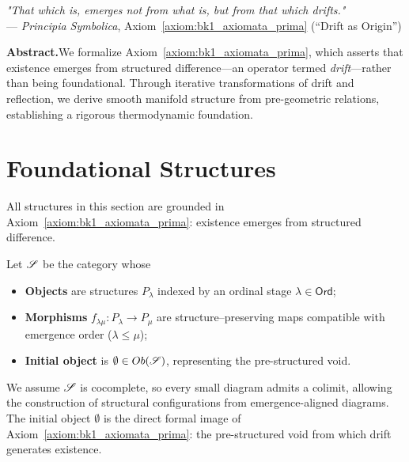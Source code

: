 ﻿
{}
\begin{center}
\textit{"That which is, emerges not from what is, but from that which drifts."} \\
— \textit{Principia Symbolica}, Axiom~\ref{axiom:bk1_axiomata_prima} (“Drift as Origin”)
\end{center}
\noindent\textbf{Abstract.}\hspace*{1em}We formalize
Axiom~\ref{axiom:bk1_axiomata_prima}, which asserts that existence emerges from
structured difference—an operator termed \textit{drift}—rather than being
foundational. Through iterative transformations of drift and reflection, we
derive smooth manifold structure from pre-geometric relations, establishing a
rigorous thermodynamic foundation.
\section{Foundational Structures}
\label{sec:bk1_foundational_structures}
All structures in this section are grounded in Axiom~\ref{axiom:bk1_axiomata_prima}: existence emerges from structured difference.
\begin{definition}
\label{definition:bk1_let_cats_be_the_category}
Let \(\mathscr{S}\) be the category whose
\begin{itemize}
  \item \textbf{Objects} are structures \(P_\lambda\) indexed by an ordinal stage \(\lambda \in \mathsf{Ord}\);
  \item \textbf{Morphisms} \(f_{\lambda\mu}\colon P_\lambda \to P_\mu\) are structure–preserving maps compatible with emergence order (\(\lambda \le \mu\));
  \item \textbf{Initial object} is \(\emptyset \in Ob(\mathscr{S})\), representing the pre-structured void.
\end{itemize}
We assume \(\mathscr{S}\) is cocomplete, so every small diagram admits a colimit, allowing the construction of structural configurations from emergence-aligned diagrams. The initial object $\emptyset$ is the direct formal image of Axiom~\ref{axiom:bk1_axiomata_prima}: the pre-structured void from which drift generates existence. \qedhere
\end{definition}
\vspace{1.2em}
